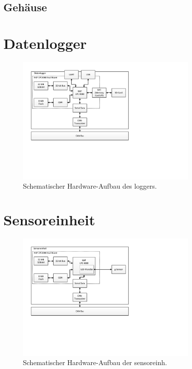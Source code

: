 \subsection{Gehäuse}
\section{Datenlogger}

\begin{figure}
	\centering
		\includegraphics[width=0.8\textwidth]{images/visio/hardware_logger.pdf}
	\caption{Schematischer Hardware-Aufbau des \gls{logger}s.}
	\label{fig.hw_logger}
\end{figure}



\section{Sensoreinheit}

\begin{figure}
	\centering
		\includegraphics[width=0.8\textwidth]{images/visio/hardware_sensor.pdf}
	\caption{Schematischer Hardware-Aufbau der \gls{sensoreinh}.}
	\label{fig.hw_sensor}
\end{figure}



